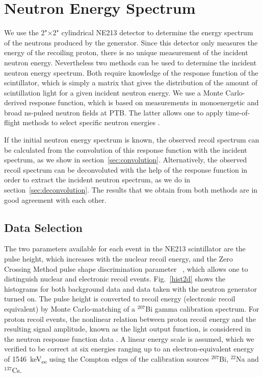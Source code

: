 \section{Neutron Energy Spectrum}\label{sec:en_spectrum}

We use the 2"$\times$2" cylindrical NE213 detector to determine the energy spectrum of the neutrons produced by the generator. Since this detector only measures the energy of the recoiling proton, there is no unique measurement of the incident neutron energy. Nevertheless two methods can be used to determine the incident neutron energy spectrum. Both require knowledge of the response function of the scintillator, which is simply a matrix that gives the distribution of the amount of scintillation light for a given incident neutron energy. We use a Monte Carlo-derived response function, which is based on measurements in monoenergetic and broad ns-pulsed neutron fields at PTB. The latter allows one to apply time-of-flight methods to select specific neutron energies \cite{dietze1982, klein2002,zimbal2006}.

If the initial neutron energy spectrum is known, the observed recoil spectrum can  be calculated from the convolution of this response function with the incident spectrum, as we show in section~\ref{sec:convolution}. Alternatively, the observed recoil spectrum can be deconvoluted with the help of the response function in order to extract the incident neutron spectrum, as we do in section~\ref{sec:deconvolution}. The results that we obtain from both methods are in good agreement with each other.

\subsection{Data Selection} \label{sec:data_selection}

The two parameters available for each event in the NE213 scintillator are the pulse height, which increases with the nuclear recoil energy, and the Zero Crossing Method pulse shape discrimination parameter ~\cite{Alexander1961}, which allows one to distinguish nuclear and electronic recoil events. Fig.~\ref{hist2d} shows the histograms for both background data and data taken with the neutron generator turned on. The pulse height is converted to recoil energy (electronic recoil equivalent) by Monte Carlo-matching of a $^{207}$Bi gamma calibration spectrum. For proton recoil events, the nonlinear relation between proton recoil energy and the resulting signal amplitude, known as the light output function, is considered in the neutron response function data \cite{novotny1997}.
A linear energy scale is assumed, which we verified to be correct at six energies ranging up to an electron-equivalent energy of \SI{1546}{keV_{ee}} using the Compton edges of the calibration sources $^{207}$Bi, $^{22}$Na and $^{137}$Cs.

